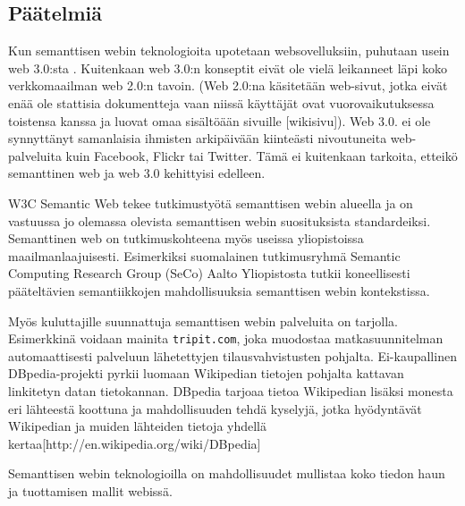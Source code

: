 \documentclass[finnish]{tktltiki2}
\theoremstyle{definition}
\theoremstyle{remark}
\begin{document}
\subsection{Päätelmiä}

Kun semanttisen webin teknologioita upotetaan websovelluksiin, puhutaan usein web 3.0:sta \cite{WEB30}. Kuitenkaan web 3.0:n konseptit eivät ole vielä leikanneet läpi koko verkkomaailman web 2.0:n tavoin. (Web 2.0:na käsitetään web-sivut, jotka eivät enää ole stattisia dokumentteja vaan niissä käyttäjät ovat vuorovaikutuksessa toistensa kanssa ja luovat omaa sisältöään sivuille [wikisivu]). Web 3.0. ei ole synnyttänyt samanlaisia ihmisten arkipäivään kiinteästi nivoutuneita  web-palveluita kuin Facebook, Flickr tai Twitter. Tämä ei kuitenkaan tarkoita, etteikö semanttinen web ja web 3.0 kehittyisi edelleen. 

W3C Semantic Web tekee tutkimustyötä semanttisen webin alueella ja on vastuussa jo olemassa olevista semanttisen webin suosituksista standardeiksi. Semanttinen web on tutkimuskohteena myös useissa yliopistoissa maailmanlaajuisesti. Esimerkiksi suomalainen tutkimusryhmä Semantic Computing Research Group (SeCo) Aalto Yliopistosta tutkii koneellisesti pääteltävien semantiikkojen mahdollisuuksia semanttisen webin kontekstissa.  

Myös kuluttajille suunnattuja semanttisen webin palveluita on tarjolla. Esimerkkinä voidaan mainita \texttt{tripit.com}, joka muodostaa matkasuunnitelman automaattisesti palveluun lähetettyjen tilausvahvistusten pohjalta. Ei-kaupallinen DBpedia-projekti pyrkii luomaan Wikipedian tietojen pohjalta kattavan linkitetyn datan tietokannan. DBpedia tarjoaa tietoa Wikipedian lisäksi monesta eri lähteestä koottuna ja mahdollisuuden tehdä kyselyjä, jotka hyödyntävät Wikipedian ja muiden lähteiden tietoja yhdellä kertaa[http://en.wikipedia.org/wiki/DBpedia] 

Semanttisen webin teknologioilla on mahdollisuudet mullistaa koko tiedon haun ja tuottamisen mallit webissä.  


%
%
% 
%
\newpage



\end{document}
